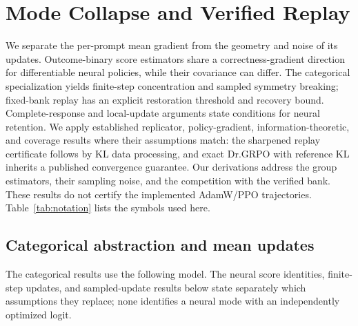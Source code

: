 \section{Mode Collapse and Verified Replay}
\label{app:theory}

We separate the per-prompt mean gradient from the geometry and noise of its
updates. Outcome-binary score estimators share a correctness-gradient
direction for differentiable neural policies, while their covariance can
differ. The categorical specialization yields finite-step concentration and
sampled symmetry breaking; fixed-bank replay has an explicit restoration
threshold and recovery bound. Complete-response and local-update arguments
state conditions for neural retention. We apply established replicator,
policy-gradient, information-theoretic, and coverage results where their
assumptions match: the sharpened replay certificate follows by KL data
processing, and exact Dr.GRPO with reference KL inherits a published
convergence guarantee. Our derivations address the group estimators, their
sampling noise, and the competition with the verified bank. These results
do not certify the implemented AdamW/PPO trajectories.
Table~\ref{tab:notation} lists the symbols used here.

\subsection{Categorical abstraction and mean updates}
\label{app:theory-grpo-mean}

The categorical results use the following model. The neural score identities,
finite-step updates, and sampled-update results below state separately which
assumptions they replace; none identifies a neural mode with an independently
optimized logit.

